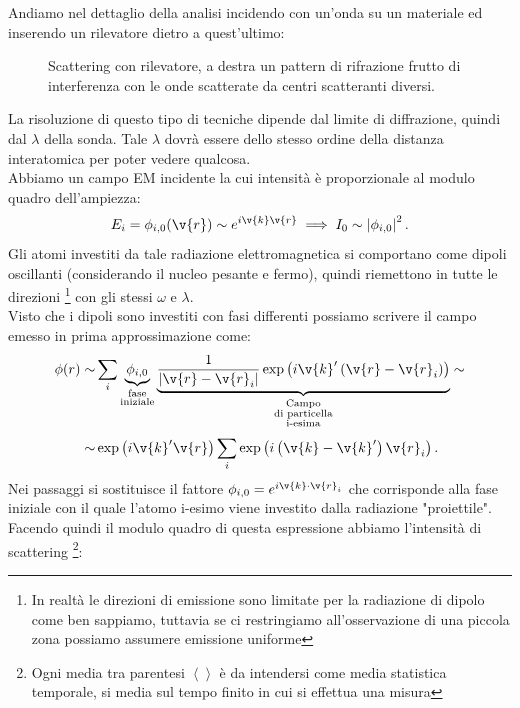 Andiamo nel dettaglio della analisi incidendo con un'onda su un materiale ed inserendo un rilevatore dietro a quest'ultimo:
\begin{figure}[H]
    \centering
    \caption{\scriptsize Scattering con rilevatore, a destra un pattern di rifrazione frutto di interferenza con le onde scatterate da centri scatteranti diversi.}
    \label{fig:scattering-con-rilevatore}
\end{figure}
\noindent
La risoluzione di questo tipo di tecniche dipende dal limite di diffrazione, quindi dal $\lambda$ della sonda. Tale $\lambda$ dovrà essere dello stesso ordine della distanza interatomica per poter vedere qualcosa.\\
Abbiamo un campo EM incidente la cui intensità è proporzionale al modulo quadro dell'ampiezza:
\[
	E_i = \phi_{i,0}(\v{r}) \sim e^{i \v{k}\v{r}} \implies I_0 \sim \left| \phi_{i,0} \right| ^2
.\] 
Gli atomi investiti da tale radiazione elettromagnetica si comportano come dipoli oscillanti (considerando il nucleo pesante e fermo), quindi riemettono in tutte le direzioni \footnote{In realtà le direzioni di emissione sono limitate per la radiazione di dipolo come ben sappiamo, tuttavia se ci restringiamo all'osservazione di una piccola zona possiamo assumere emissione uniforme} con gli stessi $\omega $ e $\lambda$.\\
Visto che i dipoli sono investiti con fasi differenti possiamo scrivere il campo emesso in prima approssimazione come:
\[\begin{aligned}
	\phi(r) \sim &
	\sum_{i}^{} 
	\underbrace{
	\phi_{i,0} 
	}_{\substack{\text{fase}\\ \text{iniziale}}}
	\underbrace{
	\frac{1}{\left| \v{r}-\v{r}_i \right|}
	\exp\left( i \v{k}'\left( \v{r}-\v{r}_i \right) \right) 
	}_{\substack{\text{Campo}\\ \text{di particella}\\ \text{i-esima}}} \sim\\ 
	\sim &
	\exp\left( i \v{k}'\v{r} \right) \sum_{i}^{} \exp\left( i \left( \v{k}-\v{k}' \right) \v{r}_i \right) 
.\end{aligned}\]
Nei passaggi si sostituisce il fattore $\phi_{i,0}=e^{i\v{k}\cdot \v{r}_i}$ che corrisponde alla fase iniziale con il quale l'atomo i-esimo viene investito dalla radiazione "proiettile".\\
Facendo quindi il modulo quadro di questa espressione abbiamo l'intensità di scattering \footnote{Ogni media tra parentesi $\left< \right>$ è da intendersi come media statistica temporale, si media sul tempo finito in cui si effettua una misura}:
